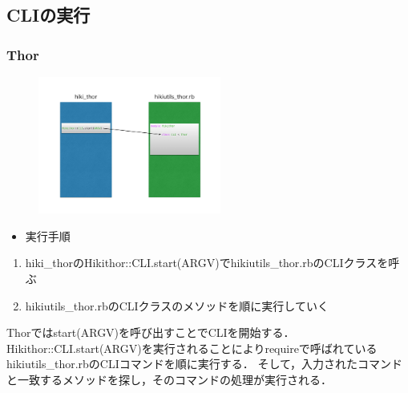 \subsection{CLIの実行}
\subsubsection{Thor}
\begin{figure}[htbp]\begin{center}
\includegraphics[width=6cm,bb=0 0 442 432]{../figs/./hikiutils_yamane_09_copy.006.jpg}
\caption{}
\label{default}\end{center}\end{figure}
\begin{itemize}
\item 実行手順
\end{itemize}
\begin{enumerate}
\item hiki\_thorのHikithor::CLI.start(ARGV)でhikiutils\_thor.rbのCLIクラスを呼ぶ
\item hikiutils\_thor.rbのCLIクラスのメソッドを順に実行していく
\end{enumerate}
Thorではstart(ARGV)を呼び出すことでCLIを開始する．Hikithor::CLI.start(ARGV)を実行されることによりrequireで呼ばれているhikiutils\_thor.rbのCLIコマンドを順に実行する．
そして，入力されたコマンドと一致するメソッドを探し，そのコマンドの処理が実行される．


